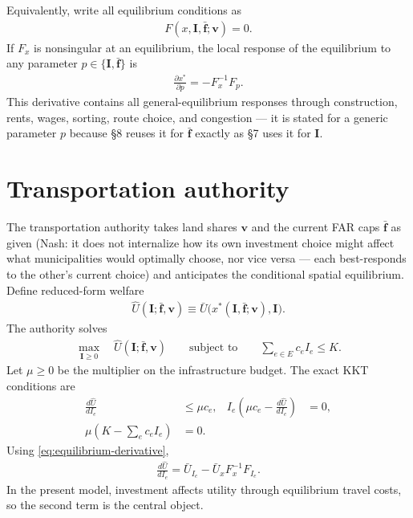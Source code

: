 \documentclass[12pt,a4paper]{article}
\newcommand{\1}{\mathbb 1}
\begin{document}
Equivalently, write all equilibrium conditions as
\begin{align}
F(x,\mathbf I,\bar{\mathbf f};\mathbf v)=0.
\label{eq:equilibrium-system}
\end{align}
If $F_x$ is nonsingular at an equilibrium, the local response of the equilibrium to any parameter $p\in\{\mathbf I,\bar{\mathbf f}\}$ is
\begin{align}
\frac{\partial x^*}{\partial p}
=
-F_x^{-1}F_{p}.
\label{eq:equilibrium-derivative}
\end{align}
This derivative contains all general-equilibrium responses through construction, rents, wages, sorting, route choice, and congestion — it is stated for a generic parameter $p$ because \S8 reuses it for $\bar{\mathbf f}$ exactly as \S7 uses it for $\mathbf I$.

\section{Transportation authority}

The transportation authority takes land shares $\mathbf v$ and the current FAR caps $\bar{\mathbf f}$ as given (Nash: it does not internalize how its own investment choice might affect what municipalities would optimally choose, nor vice versa — each best-responds to the other's current choice) and anticipates the conditional spatial equilibrium. Define reduced-form welfare
\begin{align}
\widehat U(\mathbf I;\bar{\mathbf f},\mathbf v)
\equiv
\bar U\bigl(x^*(\mathbf I,\bar{\mathbf f};\mathbf v),\mathbf I\bigr).
\label{eq:reduced-welfare}
\end{align}
The authority solves
\begin{align}
\max_{\mathbf I\geq0}
\quad
\widehat U(\mathbf I;\bar{\mathbf f},\mathbf v)
\qquad
\text{subject to}
\qquad
\sum_{e\in E}c_eI_e\leq K.
\label{eq:transport-problem}
\end{align}
Let $\mu\geq0$ be the multiplier on the infrastructure budget. The exact KKT conditions are
\begin{align}
\frac{d\widehat U}{dI_e}
&\leq \mu c_e,
&
I_e\left(\mu c_e-\frac{d\widehat U}{dI_e}\right)&=0,
\label{eq:transport-kkt}\\
\mu\left(K-\sum_ec_eI_e\right)&=0.
\label{eq:budget-kkt}
\end{align}
Using \eqref{eq:equilibrium-derivative},
\begin{align}
\frac{d\widehat U}{dI_e}
=
\bar U_{I_e}
-
\bar U_xF_x^{-1}F_{I_e}.
\label{eq:total-investment-gradient}
\end{align}
In the present model, investment affects utility through equilibrium travel costs, so the second term is the central object.
\end{document}
